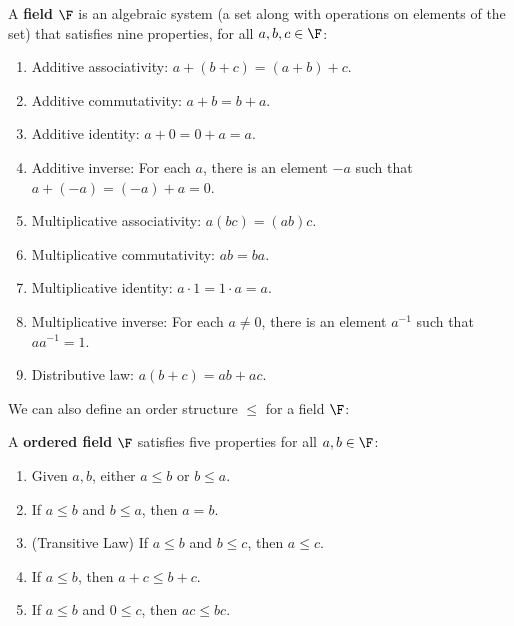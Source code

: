 \documentclass[math1010-lecture-notes]{subfiles}
\begin{document}
\begin{definition}[Fields]{}
  A \textbf{field} $\F$ is an algebraic system (a set along with operations on elements of the set) that
  satisfies nine properties, for all $a,b,c\in \F$:
  \begin{enumerate}
    \item Additive associativity: $a+(b+c)=(a+b)+c$.
    \item Additive commutativity: $a+b=b+a$.
    \item Additive identity: $a+0=0+a=a$.
    \item Additive inverse: For each  $a$, there is an element $-a$ such that  $a+(-a)=(-a)+a=0$. 
    \item Multiplicative associativity: $a(bc)=(ab)c$.
    \item Multiplicative commutativity: $ab=ba$.
    \item Multiplicative identity:  $a\cdot 1=1\cdot a=a$.
    \item Multiplicative inverse: For each  $a\neq 0$, there is an element $a^{-1}$ such that
      $aa^{-1}=1$.
    \item Distributive law: $a(b+c)=ab+ac$.
  \end{enumerate}
\end{definition}

We can also define an order structure $\le $ for a field $\F$:
\begin{definition}[Order]{}
  A \textbf{ordered field} $\F$ satisfies five properties for all $a,b\in \F$:
  \begin{enumerate}
    \item Given $a,b$, either $a\le b$ or $b\le a$.
    \item If $a\le b$ and $b\le a$, then $a=b$.
    \item (Transitive Law) If $a\le b$ and $b\le c$, then $a\le c$.
    \item If $a\le b$, then $a+c\le b+c$.
    \item If $a\le b$ and $0\le c$, then $ac\le bc$.
  \end{enumerate}
\end{definition}
\end{document}
